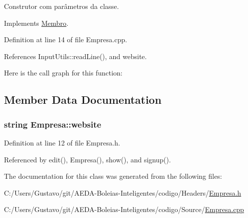Construtor com parâmetros da classe. 



Implements \hyperlink{class_membro_ab88b510a234c18aa035c28f4253140b3}{Membro}.



Definition at line 14 of file Empresa.\+cpp.



References Input\+Utils\+::read\+Line(), and website.



Here is the call graph for this function\+:




\subsection{Member Data Documentation}
\hypertarget{class_empresa_a809624b98d1db18f8627ce2fa394dddd}{
\subsubsection[{website}]{\setlength{\rightskip}{0pt plus 5cm}string Empresa\+::website\hspace{0.3cm}{\ttfamily [private]}}}\label{class_empresa_a809624b98d1db18f8627ce2fa394dddd}


Definition at line 12 of file Empresa.\+h.



Referenced by edit(), Empresa(), show(), and signup().



The documentation for this class was generated from the following files\+:\begin{DoxyCompactItemize}
\item 
C\+:/\+Users/\+Gustavo/git/\+A\+E\+D\+A-\/\+Boleias-\/\+Inteligentes/codigo/\+Headers/\hyperlink{_empresa_8h}{Empresa.\+h}\item 
C\+:/\+Users/\+Gustavo/git/\+A\+E\+D\+A-\/\+Boleias-\/\+Inteligentes/codigo/\+Source/\hyperlink{_empresa_8cpp}{Empresa.\+cpp}\end{DoxyCompactItemize}
